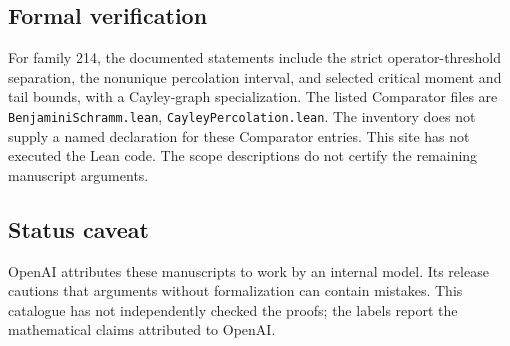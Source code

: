 \documentclass[11pt]{article}
\begin{document}
\subsection{Formal verification}
For family 214, the documented statements include the strict operator-threshold separation, the nonunique percolation interval, and selected critical moment and tail bounds, with a Cayley-graph specialization. The listed Comparator files are \texttt{BenjaminiSchramm.lean}, \texttt{CayleyPercolation.lean}. The inventory does not supply a named declaration for these Comparator entries. This site has not executed the Lean code. The scope descriptions do not certify the remaining manuscript arguments.

\subsection{Status caveat}
OpenAI attributes these manuscripts to work by an internal model. Its release cautions that arguments without formalization can contain mistakes. This catalogue has not independently checked the proofs; the labels report the mathematical claims attributed to OpenAI.
\end{document}

